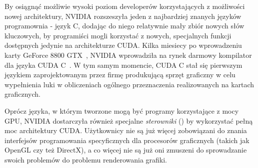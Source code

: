 By osiągnąć możliwie wysoki poziom developerów korzystających z możliwości nowej architektury, NVIDIA rozszeszyła jeden z najbardziej znanych języków programownia - język C, dodając do niego relatywnie mały zbiór nowych słów kluczowych, by programiści mogli korzystać z nowych, specjalnych funkcji dostępnych jedynie na architekturze CUDA. Kilka miesiecy po wprowadzeniu karty GeForce 8800 GTX~\cite{nvidia:geforce8800}, NVIDIA wprowadziła na rynek darmowy kompilator dla języka CUDA C~\cite{cuda:downloads}. W tym samym momencie, CUDA C stał się pierwszym językiem zaprojektowanym przez firmę produkującą sprzęt graficzny w celu wypełnienia luki w obliczeniach ogólnego przeznaczenia realizowanych na kartach graficznych.

Oprócz języka, w którym tworzone mogą być programy korzystające z mocy GPU, NVIDIA dostarczyła również specjalne \emph{sterowniki} () by wykorzystać pełną moc architektury CUDA. Użytkownicy nie są już więcej zobowiązani do znania interfejsów programowania specyficznych dla procesorów graficznych (takich jak OpenGL czy też DirectX), a co więcej nie są już oni zmuszeni do sprowadzanie swoich problemów do problemu renderowania grafiki.